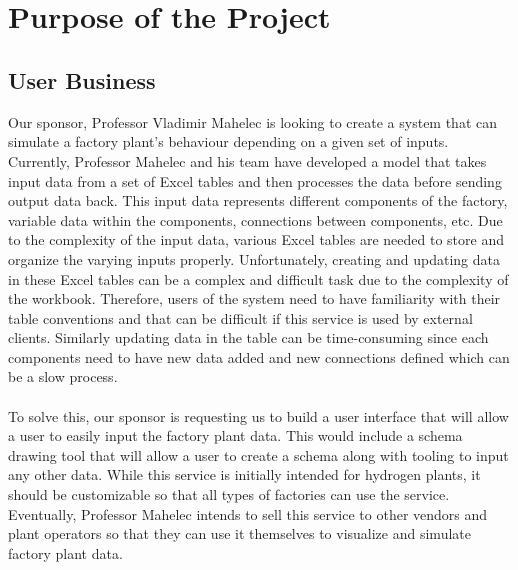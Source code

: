 \documentclass[12pt]{article}
\begin{document}
~\\

~\newpage
\section{Purpose of the Project}
\subsection{User Business}

Our sponsor, Professor Vladimir Mahelec is looking to create a system that can simulate a factory plant's behaviour depending on a given set of inputs. Currently, Professor Mahelec and his team have developed a model that takes input data from a set of Excel tables and then processes the data before sending output data back. This input data represents different components of the factory, variable data within the components, connections between components, etc. Due to the complexity of the input data, various Excel tables are needed to store and organize the varying inputs properly. Unfortunately, creating and updating data in these Excel tables can be a complex and difficult task due to the complexity of the workbook. Therefore, users of the system need to have familiarity with their table conventions and that can be difficult if this service is used by external clients. Similarly updating data in the table can be time-consuming since each components need to have new data added and new connections defined which can be a slow process. 
\\\\
To solve this, our sponsor is requesting us to build a user interface that will allow a user to easily input the factory plant data. This would include a schema drawing tool that will allow a user to create a schema along with tooling to input any other data. While this service is initially intended for hydrogen plants, it should be customizable so that all types of factories can use the service. Eventually, Professor Mahelec intends to sell this service to other vendors and plant operators so that they can use it themselves to visualize and simulate factory plant data. 
\end{document}
